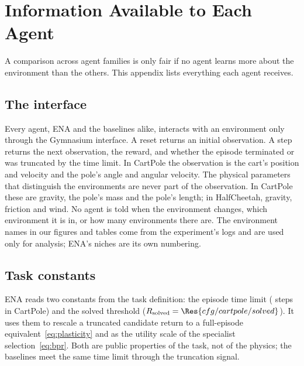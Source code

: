 \section{Information Available to Each Agent}
\label{app:information}
A comparison across agent families is only fair if no agent learns more about the environment than the others. This appendix lists everything each agent receives.

\subsection{The interface}
Every agent, ENA and the baselines alike, interacts with an environment only through the Gymnasium interface. A reset returns an initial observation. A step returns the next observation, the reward, and whether the episode terminated or was truncated by the time limit. In CartPole the observation is the cart's position and velocity and the pole's angle and angular velocity. The physical parameters that distinguish the environments are never part of the observation. In CartPole these are gravity, the pole's mass and the pole's length; in HalfCheetah, gravity, friction and wind. No agent is told when the environment changes, which environment it is in, or how many environments there are. The environment names in our figures and tables come from the experiment's logs and are used only for analysis; ENA's niches are its own numbering.

\subsection{Task constants}
ENA reads two constants from the task definition: the episode time limit ( steps in CartPole) and the solved threshold ($R_{\text{solved}} = \Res{cfg/cartpole/solved}$). It uses them to rescale a truncated candidate return to a full-episode equivalent~\eqref{eq:plasticity} and as the utility scale of the specialist selection~\eqref{eq:bpr}. Both are public properties of the task, not of the physics; the baselines meet the same time limit through the truncation signal.

